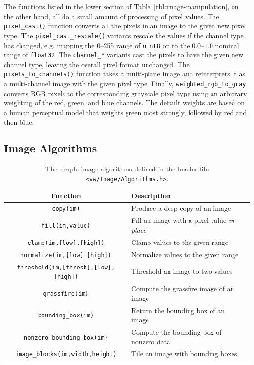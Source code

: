 The functions listed in the lower section of Table~\ref{tbl:image-manipulation}, 
on the other hand, all do a small amount of processing of pixel values.  
The \verb#pixel_cast()# function converts all the pixels in an image to the 
given new pixel type.  The \verb#pixel_cast_rescale()# variants rescale the 
values if the channel type has changed, e.g. mapping the 0--255 range of 
\verb#uint8# on to the $0.0$--$1.0$ nominal range of \verb#float32#.  The 
\verb#channel_*# variants cast the pixels to have the given new channel type, 
leaving the overall pixel format unchanged.  The \verb#pixels_to_channels()# 
function takes a multi-plane image and reinterprets it as a multi-channel 
image with the given pixel type.  Finally, \verb#weighted_rgb_to_gray# converts 
RGB pixels to the corresponding grayscale pixel type using an arbitrary 
weighting of the red, green, and blue channels.  The default weights are 
based on a human perceptual model that weights green most strongly, followed 
by red and then blue.

\subsection{Image Algorithms}

\begin{table}[t]\begin{centering}
\begin{tabular}{|c|l|l|} \hline
Function & Description \\ \hline \hline
\verb#copy(im)# & Produce a deep copy of an image \\ \hline
\verb#fill(im,value)# & Fill an image with a pixel value {\it in-place} \\ \hline
\verb#clamp(im,[low],[high])# & Clamp values to the given range \\ \hline
\verb#normalize(im,[low],[high])# & Normalize values to the given range \\ \hline
\verb#threshold(im,[thresh],[low],[high])# & Threshold an image to two values \\ \hline
\verb#grassfire(im)# & Compute the grassfire image of an image \\ \hline
\verb#bounding_box(im)# & Return the bounding box of an image \\ \hline
\verb#nonzero_bounding_box(im)# & Compute the bounding box of nonzero data \\ \hline
\verb#image_blocks(im,width,height)# & Tile an image with bounding boxes \\ \hline
\end{tabular}
\caption{The simple image algorithms defined in the header file {\tt <vw/Image/Algorithms.h>}.}
\label{tbl:image-algorithms}
\end{centering}\end{table}

